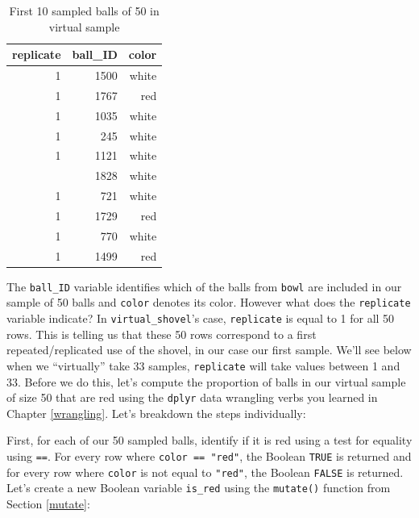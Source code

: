 \documentclass[12pt, krantz2,]{krantz}
\makeatletter
\newenvironment{Shaded}{\begin{snugshade}}{\end{snugshade}}
\newcommand{\DataTypeTok}[1]{\textcolor[rgb]{0.27,0.27,0.27}{#1}}
\newcommand{\KeywordTok}[1]{\textcolor[rgb]{0.27,0.27,0.27}{\textbf{#1}}}
\newcommand{\NormalTok}[1]{#1}
\newcommand{\OperatorTok}[1]{\textcolor[rgb]{0.43,0.43,0.43}{\textbf{#1}}}
\newcommand{\StringTok}[1]{\textcolor[rgb]{0.5,0.5,0.5}{#1}}
\newenvironment{kframe}{%
\medskip{}
\setlength{\fboxsep}{.8em}
 \def\at@end@of@kframe{}%
 \ifinner\ifhmode%
  \def\at@end@of@kframe{\end{minipage}}%
  \begin{minipage}{\columnwidth}%
 \fi\fi%
 \def\FrameCommand##1{\hskip\@totalleftmargin \hskip-\fboxsep
 \colorbox{shadecolor}{##1}\hskip-\fboxsep
     \hskip-\linewidth \hskip-\@totalleftmargin \hskip\columnwidth}%
 \MakeFramed {\advance\hsize-\width
   \@totalleftmargin\z@ \linewidth\hsize
   \@setminipage}}%
 {\par\unskip\endMakeFramed%
 \at@end@of@kframe}
\renewenvironment{Shaded}{\begin{kframe}}{\end{kframe}}
\makeatother
\begin{document}
\begin{table}[H]

\caption{\label{tab:virtual-shovel}First 10 sampled balls of 50 in virtual sample}
\centering
\fontsize{10}{12}\selectfont
\begin{tabular}{rrr}
\toprule
replicate & ball\_ID & color\\
\midrule
1 & 1500 & white\\
1 & 1767 & red\\
1 & 1035 & white\\
1 & 245 & white\\
1 & 1121 & white\\
\addlinespace
1 & 1828 & white\\
1 & 721 & white\\
1 & 1729 & red\\
1 & 770 & white\\
1 & 1499 & red\\
\bottomrule
\end{tabular}
\end{table}

The \texttt{ball\_ID} variable identifies which of the balls from \texttt{bowl} are included in our sample of 50 balls and \texttt{color} denotes its color. However what does the \texttt{replicate} variable indicate? In \texttt{virtual\_shovel}'s case, \texttt{replicate} is equal to 1 for all 50 rows. This is telling us that these 50 rows correspond to a first repeated/replicated use of the shovel, in our case our first sample. We'll see below when we ``virtually'' take 33 samples, \texttt{replicate} will take values between 1 and 33. Before we do this, let's compute the proportion of balls in our virtual sample of size 50 that are red using the \texttt{dplyr} data wrangling verbs you learned in Chapter \ref{wrangling}. Let's breakdown the steps individually:

First, for each of our 50 sampled balls, identify if it is red using a test for equality using \texttt{==}. For every row where \texttt{color\ ==\ "red"}, the Boolean \texttt{TRUE} is returned and for every row where \texttt{color} is not equal to \texttt{"red"}, the Boolean \texttt{FALSE} is returned. Let's create a new Boolean variable \texttt{is\_red} using the \texttt{mutate()} function from Section \ref{mutate}:

\begin{Shaded}
\end{Shaded}
\end{document}
